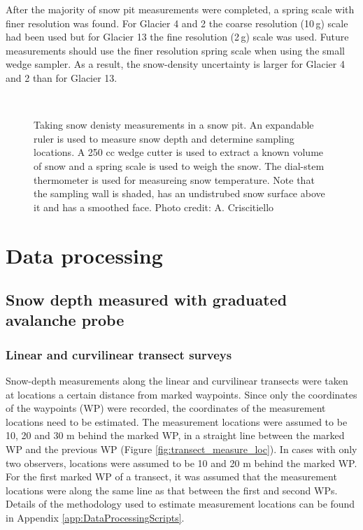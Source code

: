 \documentclass{sfuthesis}
\begin{document}
After the majority of snow pit measurements were completed, a spring scale with finer resolution was found. For Glacier 4 and 2 the coarse resolution (10\,g) scale had been used but for Glacier 13 the fine resolution (2\,g) scale was used. Future measurements should use the finer resolution spring scale when using the small wedge sampler. As a result, the snow-density uncertainty is larger for Glacier 4 and 2 than for Glacier 13. 

\begin{figure}[H]
	\centering
	\\
	\caption{Taking snow denisty measurements in a snow pit. An expandable ruler is used to measure snow depth and determine sampling locations. A 250 cc wedge cutter is used to extract a known volume of snow and a spring scale is used to weigh the snow. The dial-stem thermometer is used for measureing snow temperature. Note that the sampling wall is shaded, has an undistrubed snow surface above it and has a smoothed face. Photo credit: A. Criscitiello}
	\label{photo_snowpit}
	\end{figure}

\section{Data processing}
\subsection{Snow depth measured with graduated avalanche probe}

\subsubsection{Linear and curvilinear transect surveys}

Snow-depth measurements along the linear and curvilinear transects were taken at locations a certain distance from marked waypoints. Since only the coordinates of the waypoints (WP) were recorded, the coordinates of the measurement locations need to be estimated. The measurement locations were assumed to be 10, 20 and 30 m behind the marked WP, in a straight line between the marked WP and the previous WP (Figure \ref{fig:transect_measure_loc}). In cases with only two observers, locations were assumed to be 10 and 20 m behind the marked WP. For the first marked WP of a transect, it was assumed that the measurement locations were along the same line as that between the first and second WPs. Details of the methodology used to estimate measurement locations can be found in Appendix \ref{app:DataProcessingScripts}.
\end{document}
